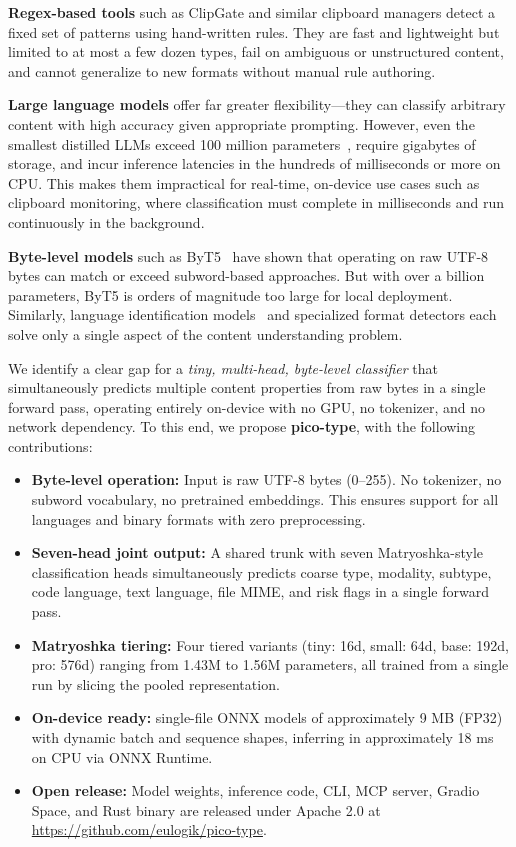 \documentclass[11pt,a4paper]{article}
\begin{document}
\textbf{Regex-based tools} such as ClipGate and similar clipboard managers detect a fixed set of patterns using hand-written rules.
They are fast and lightweight but limited to at most a few dozen types, fail on ambiguous or unstructured content, and cannot generalize to new formats without manual rule authoring.

\textbf{Large language models} offer far greater flexibility---they can classify arbitrary content with high accuracy given appropriate prompting.
However, even the smallest distilled LLMs exceed 100 million parameters~\cite{distilbert,mobilebert}, require gigabytes of storage, and incur inference latencies in the hundreds of milliseconds or more on CPU.
This makes them impractical for real-time, on-device use cases such as clipboard monitoring, where classification must complete in milliseconds and run continuously in the background.

\textbf{Byte-level models} such as ByT5~\cite{byt5} have shown that operating on raw UTF-8 bytes can match or exceed subword-based approaches.
But with over a billion parameters, ByT5 is orders of magnitude too large for local deployment.
Similarly, language identification models~\cite{blili} and specialized format detectors each solve only a single aspect of the content understanding problem.

We identify a clear gap for a \emph{tiny, multi-head, byte-level classifier} that simultaneously predicts multiple content properties from raw bytes in a single forward pass, operating entirely on-device with no GPU, no tokenizer, and no network dependency.
To this end, we propose \textbf{pico-type}, with the following contributions:

\begin{itemize}[noitemsep]
  \item \textbf{Byte-level operation:} Input is raw UTF-8 bytes (0--255). No tokenizer, no subword vocabulary, no pretrained embeddings. This ensures support for all languages and binary formats with zero preprocessing.
  \item \textbf{Seven-head joint output:} A shared trunk with seven Matryoshka-style classification heads simultaneously predicts coarse type, modality, subtype, code language, text language, file MIME, and risk flags in a single forward pass.
  \item \textbf{Matryoshka tiering:} Four tiered variants (tiny: 16d, small: 64d, base: 192d, pro: 576d) ranging from 1.43M to 1.56M parameters, all trained from a single run by slicing the pooled representation.
  \item \textbf{On-device ready:} single-file ONNX models of approximately 9 MB (FP32) with dynamic batch and sequence shapes, inferring in approximately 18 ms on CPU via ONNX Runtime.
  \item \textbf{Open release:} Model weights, inference code, CLI, MCP server, Gradio Space, and Rust binary are released under Apache 2.0 at \url{https://github.com/eulogik/pico-type}.
\end{itemize}
\end{document}
